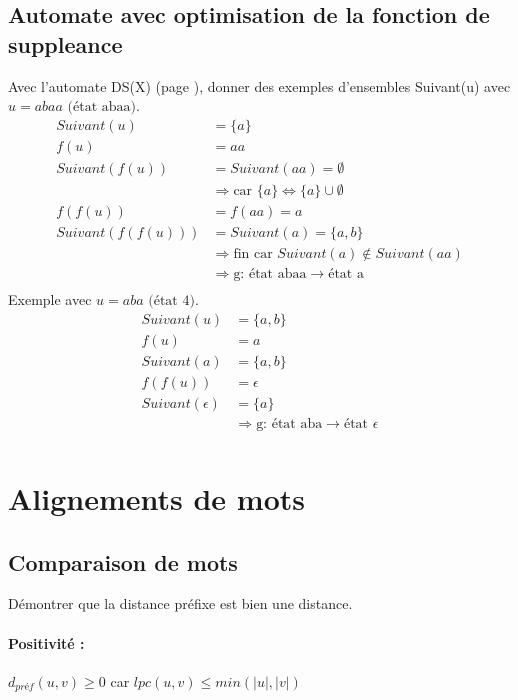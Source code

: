 \documentclass[11pt,a4paper]{article}
\begin{document}
	\subsection{Automate avec optimisation de la fonction de suppleance}
	
	Avec l'automate DS(X) (page \pageref{DS(X)}), donner des exemples d'ensembles Suivant(u) avec $u = abaa \text{ (état abaa)}$.\\
	\begin{align*}
		Suivant(u) &= \{a\}\\
		f(u) &= aa\\
		Suivant(f(u)) &= Suivant(aa) = \emptyset\\
		&\Rightarrow \text{car } \{a\} \Leftrightarrow \{a\} \cup \emptyset \\
		f(f(u)) &= f(aa) = a\\
		Suivant(f(f(u))) &= Suivant(a) = \{a, b\}\\
		&\Rightarrow \text{fin car } Suivant(a) \notin Suivant(aa)\\
		&\Rightarrow \text{g: état abaa} \rightarrow \text{état a}\\
	\end{align*}
	Exemple avec $u = aba \text{ (état 4)}$.\\
	\begin{align*}
		Suivant(u) &= \{a, b\}\\
		f(u) &= a\\
		Suivant(a) &= \{a, b\}\\
		f(f(u)) &= \epsilon\\
		Suivant(\epsilon) &= \{a\}\\
		&\Rightarrow \text{g: état aba} \rightarrow \text{état }\epsilon\\
	\end{align*}
	
	\newpage
	
	\section{Alignements de mots}
	
	\subsection{Comparaison de mots}
	
	Démontrer que la distance préfixe est bien une distance.
	\paragraph{Positivité :}
	$d_{préf}(u,v) \geq 0$ car $lpc(u,v) \leq min(|u|,|v|)$
\end{document}

